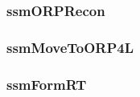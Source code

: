 \documentclass[../../main/main.tex]{subfiles}
\begin{document}
\subsubsection{ssmORPRecon}

\subsubsection{ssmMoveToORP4L}

\subsubsection{ssmFormRT}
\end{document}
